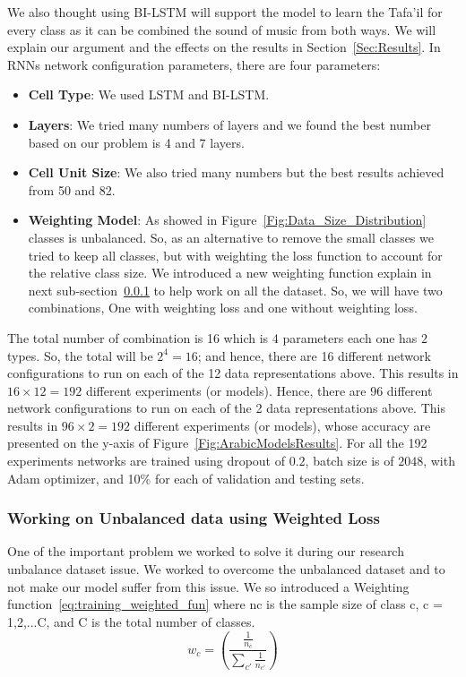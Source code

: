 We also thought using BI-LSTM will support the model to learn the Tafa'il for every class as it can be combined the sound of music from both ways. We will explain our argument and the effects on the results in Section~\ref{Sec:Results}.
In RNNs network configuration parameters, there are four parameters:
\begin{itemize}
  \item \textbf{Cell Type}: We used LSTM and BI-LSTM.
  \item \textbf{Layers}: We tried many numbers of layers and we found the best number based on our problem is 4 and 7 layers.
  \item \textbf{Cell Unit Size}: We also tried many numbers but the best results achieved from 50 and 82.
  \item \textbf{Weighting Model}: As showed in Figure~\ref{Fig:Data_Size_Distribution} classes is unbalanced. So, as an alternative to remove the small classes we tried to keep all classes, but with weighting the loss function to account for the relative class size. We introduced a new weighting function explain in next sub-section~\ref{Sec:W_Loss} to help work on all the dataset. So, we will have two combinations, One with weighting loss and one without weighting loss.
  
\end{itemize}

The total number of combination is 16 which is $4$ parameters each one has $2$ types. So, the total will be $2^4=16$; and hence, there are 16 different network configurations to run on each of the 12 data representations above. This results in $16 \times 12 = 192$ different experiments (or models). Hence, there are 96 different network configurations to run on each of the 2 data representations above. This results in $96 \times 2 = 192$ different experiments (or models), whose accuracy are presented on the y-axis of Figure~\ref{Fig:ArabicModelsResults}. For all the 192 experiments networks are trained using dropout of $0.2$, batch size is of $2048$, with Adam optimizer, and 10\% for each of validation and testing sets.


\subsubsection{Working on Unbalanced data using Weighted Loss}\label{Sec:W_Loss}

One of the important problem we worked to solve it during our research unbalance dataset issue. We worked to overcome the unbalanced dataset and to not make our model suffer from this issue. We so introduced a Weighting function~\ref{eq:training_weighted_fun} where nc is the sample size of class c, c = 1,2,...C, and C is the total number of classes.%
\begin{equation}\label{eq:training_weighted_fun}
  w_c = \left(\frac{\frac{1}{n_c}}{\sum_{c'} \frac{1}{n_{c'}}} \right)
\end{equation}

